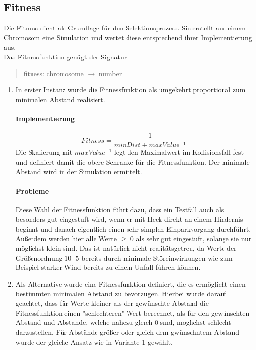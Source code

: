 \documentclass[12pt,a4paper]{scrartcl}
\begin{document}
\subsection{Fitness}
Die Fitness dient als Grundlage für den Selektionsprozess. Sie erstellt aus einem Chromosom eine Simulation und wertet diese entsprechend ihrer Implementierung aus.\\
Das Fitnessfunktion genügt der Signatur
\begin{quote}
	\textsf{fitness: chromosome $\rightarrow$ number}
\end{quote}
\begin{enumerate}
	\item In erster Instanz wurde die Fitnessfunktion als umgekehrt proportional zum minimalen Abstand realisiert.
	\paragraph{Implementierung}
	\[Fitness = \frac{1}{minDist + maxValue^{-1}}\]
Die Skalierung mit $maxValue^{-1}$ legt den Maximalwert im Kollisionsfall fest und definiert damit die obere Schranke für die Fitnessfunktion. Der minimale Abstand wird in der Simulation ermittelt.
\paragraph{Probleme} Diese Wahl der Fitnessfunktion führt dazu, dass ein Testfall auch als besonders gut eingestuft wird, wenn er mit Heck direkt an einem Hindernis beginnt und danach eigentlich einen sehr simplen Einparkvorgang durchführt.\\
Außerdem werden hier alle Werte $\ge$ 0 als sehr gut eingestuft, solange sie nur möglichst klein sind. Das ist natürlich nicht realitätsgetreu, da Werte der Größenordnung $10^-5$ bereits durch minimale Störeinwirkungen wie zum Beispiel starker Wind bereits zu einem Unfall führen können.
	\item Als Alternative wurde eine Fitnessfunktion definiert, die es ermöglicht einen bestimmten minimalen Abstand zu bevorzugen. Hierbei wurde darauf geachtet, dass für Werte kleiner als der gewünschte Abstand die Fitnessfunktion einen "schlechteren" Wert berechnet, als für den gewünschten Abstand und Abstände, welche nahezu gleich 0 sind, möglichst schlecht darzustellen. Für Abstände größer oder gleich dem gwünschntem Abstand wurde der gleiche Ansatz wie in Variante 1 gewählt.\\

\end{enumerate}
\end{document}
